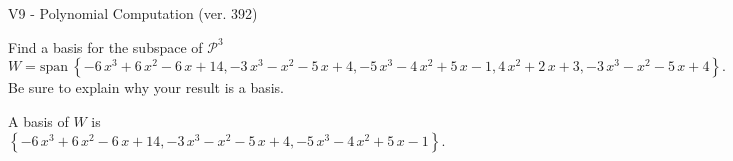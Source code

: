 \begin{exercise}
  \begin{exerciseTitle}V9 - Polynomial Computation (ver. 392)\end{exerciseTitle}
  \begin{exerciseStatement}
    Find a basis for the subspace of \(\mathcal{P}^3\) 
\[W=\mathrm{span}\ \left\{-6 \, x^{3} + 6 \, x^{2} - 6 \, x + 14 , -3 \, x^{3} - x^{2} - 5 \, x + 4 , -5 \, x^{3} - 4 \, x^{2} + 5 \, x - 1 , 4 \, x^{2} + 2 \, x + 3 , -3 \, x^{3} - x^{2} - 5 \, x + 4\right\}.\]
 Be sure to explain why your result is a basis.


  \end{exerciseStatement}
  \begin{exerciseAnswer}
   A basis of \(W\) is  \(\left\{-6 \, x^{3} + 6 \, x^{2} - 6 \, x + 14 , -3 \, x^{3} - x^{2} - 5 \, x + 4 , -5 \, x^{3} - 4 \, x^{2} + 5 \, x - 1\right\}\).
  


  \end{exerciseAnswer}
\end{exercise}